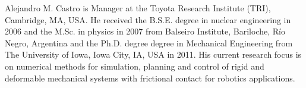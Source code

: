 \begin{IEEEbiography}{Alejandro
M. Castro} is Manager at the Toyota Research Institute (TRI), Cambridge, MA, USA.
He received the B.S.E. degree in nuclear engineering in 2006 and the M.Sc. in
physics in 2007 from Balseiro Institute, Bariloche, R\'io Negro, Argentina and
the Ph.D. degree degree in Mechanical Engineering from The University of Iowa,
Iowa City, IA, USA in 2011. His current research focus is on numerical methods
for simulation, planning and control of rigid and deformable mechanical systems
with frictional contact for robotics applications.
\end{IEEEbiography}
